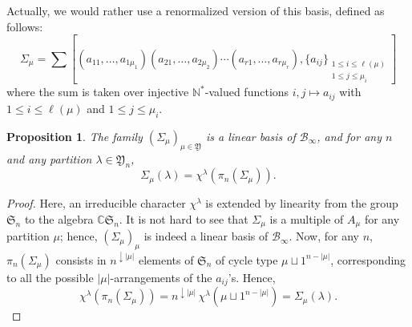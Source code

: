 \documentclass[smallextended,nospthms]{svjour3}
\newtheorem{proposition}[theorem]{Proposition}
\theoremstyle{remark}
\newcommand{\N}{\mathbb{N}}
\newcommand{\C}{\mathbb{C}}
\newcommand{\sym}{\mathfrak{S}}
\newcommand{\ym}{\mathfrak{Y}}
\newcommand{\blg}{\mathscr{B}}
\begin{document}
Actually, we would rather use a renormalized version of this basis, defined as follows:
$$\varSigma_{\mu}=\sum\left[(a_{11},\ldots,a_{1\mu_{1}})(a_{21},\ldots,a_{2\mu_{2}})\cdots(a_{r1},\ldots,a_{r\mu_{r}}), \{a_{ij} \}_{\substack{1 \leq i \leq \ell(\mu) \\ 1\leq j \leq \mu_{i}}}\right]$$
where the sum is taken over injective $\N^{*}$-valued functions $i,j \mapsto a_{ij}$ with $1 \leq i \leq \ell(\mu)$ and $1\leq j \leq \mu_{i}$.
\begin{proposition}\label{fringe}
The family $(\varSigma_{\mu})_{\mu \in \ym}$ is a linear basis of $\blg_{\infty}$, and for any $n$ and any partition $\lambda \in \ym_{n}$,
$$\varSigma_{\mu}(\lambda)=\chi^{\lambda}(\pi_{n}(\varSigma_{\mu})).$$
\end{proposition}
\begin{proof}
Here, an irreducible character $\chi^{\lambda}$ is extended by linearity from the group $\sym_{n}$ to the algebra $\C\sym_{n}$. It is not hard to see that $\varSigma_{\mu}$ is a multiple of $A_{\mu}$ for any partition $\mu$; hence, $(\varSigma_{\mu})_{\mu}$ is indeed a linear basis of $\blg_{\infty}$. Now, for any $n$, $\pi_{n}(\varSigma_{\mu})$ consists in $n^{\downarrow |\mu|}$ elements of $\sym_{n}$ of cycle type $\mu \sqcup 1^{n-|\mu|}$, corresponding to all the possible $|\mu|$-arrangements of the $a_{ij}$'s. Hence,
$$\chi^{\lambda}(\pi_{n}(\varSigma_{\mu}))=n^{\downarrow |\mu|}\,\chi^{\lambda}(\mu \sqcup 1^{n-|\mu|})=\varSigma_{\mu}(\lambda).$$
\end{proof}\bigskip
\end{document}
